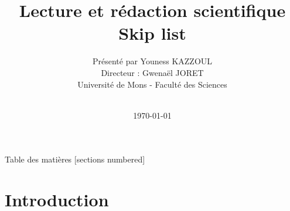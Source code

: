 \documentclass{beamer}
\title[Lecture et rédaction scientifique]{Lecture et rédaction scientifique \\ Skip list}
\author[Skip List (Y. KAZZOUL)]{ 
	Présenté par Youness KAZZOUL \\[0.8cm] 
	Directeur : Gwenaël JORET \\[0.1cm] 
	Université de Mons - Faculté des Sciences}
\date[Umons - 2022]{\\[-2cm]\today}
\begin{document}
	
	\maketitle	
	

	\begin{frame}{Table des matières}
	[sections numbered]
	\tableofcontents%
	~\end{frame}

	
\section[Introduction]{Introduction}
\end{document}
